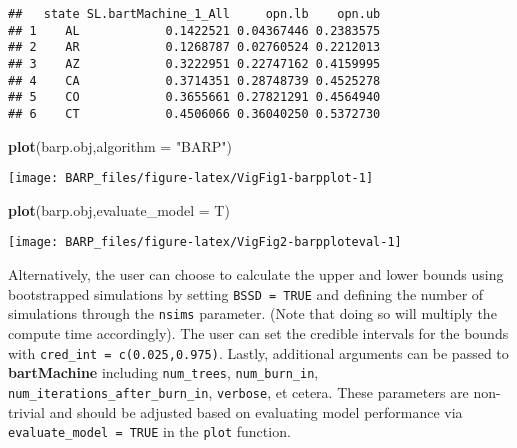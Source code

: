 \documentclass[]{article}
\newenvironment{Shaded}{\begin{snugshade}}{\end{snugshade}}
\newcommand{\KeywordTok}[1]{\textcolor[rgb]{0.13,0.29,0.53}{\textbf{#1}}}
\newcommand{\DataTypeTok}[1]{\textcolor[rgb]{0.13,0.29,0.53}{#1}}
\newcommand{\StringTok}[1]{\textcolor[rgb]{0.31,0.60,0.02}{#1}}
\newcommand{\NormalTok}[1]{#1}
\begin{document}
\begin{verbatim}
##   state SL.bartMachine_1_All     opn.lb    opn.ub
## 1    AL            0.1422521 0.04367446 0.2383575
## 2    AR            0.1268787 0.02760524 0.2212013
## 3    AZ            0.3222951 0.22747162 0.4159995
## 4    CA            0.3714351 0.28748739 0.4525278
## 5    CO            0.3655661 0.27821291 0.4564940
## 6    CT            0.4506066 0.36040250 0.5372730
\end{verbatim}

\begin{Shaded}
\begin{Highlighting}[]
\KeywordTok{plot}\NormalTok{(barp.obj,}\DataTypeTok{algorithm =} \StringTok{"BARP"}\NormalTok{)}
\end{Highlighting}
\end{Shaded}

\begin{center}\texttt{[image: BARP\_files/figure-latex/VigFig1-barpplot-1]} \end{center}

\begin{Shaded}
\begin{Highlighting}[]
\KeywordTok{plot}\NormalTok{(barp.obj,}\DataTypeTok{evaluate_model =}\NormalTok{ T)}
\end{Highlighting}
\end{Shaded}

\begin{center}\texttt{[image: BARP\_files/figure-latex/VigFig2-barpploteval-1]} \end{center}

Alternatively, the user can choose to calculate the upper and lower
bounds using bootstrapped simulations by setting \texttt{BSSD\ =\ TRUE}
and defining the number of simulations through the \texttt{nsims}
parameter. (Note that doing so will multiply the compute time
accordingly). The user can set the credible intervals for the bounds
with \texttt{cred\_int\ =\ c(0.025,0.975)}. Lastly, additional arguments
can be passed to \textbf{bartMachine} including \texttt{num\_trees},
\texttt{num\_burn\_in}, \texttt{num\_iterations\_after\_burn\_in},
\texttt{verbose}, et cetera. These parameters are non-trivial and should
be adjusted based on evaluating model performance via
\texttt{evaluate\_model\ =\ TRUE} in the \texttt{plot} function.
\end{document}
